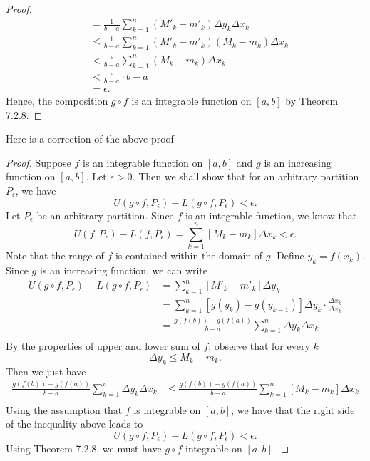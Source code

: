 \begin{enumerate}
\begin{proof}
\begin{align*}
								&=  \frac{ 1 }{ b-a } \sum_{ k=1 }^{ n }  (M'_{k} - m'_{k }) \Delta y_{k} \Delta x_{k } \\
								&\leq \frac{ 1 }{ b-a } \sum_{ k=1 }^{ n } (M'_{k } - m'_{k } )  (M_{k } - m_{k } ) \Delta x_{k } \\
								&< \frac{ \epsilon  }{ b -a  } \sum_{ k=1 }^{ n } (M_{k } - m_{k }) \Delta x_{k } \\
								&< \frac{ \epsilon  }{ b -a  } \cdot b -a  \\
								&= \epsilon.
 	\end{align*}
	Hence, the composition \( g \circ f \) is an integrable function on \( [a,b] \) by Theorem 7.2.8.
	\end{proof}
	Here is a correction of the above proof
	\begin{proof}
		Suppose \( f  \) is an integrable function on \( [a,b] \) and \( g  \) is an increasing function on \( [a,b]  \). Let \( \epsilon > 0  \). Then we shall show that for an arbitrary partition \( P_{\epsilon } \), we have 
		\[  U( g \circ f, P_{\epsilon }) - L(g \circ f, P_{\epsilon }) < \epsilon. \] 
		Let \( P_{\epsilon } \) be an arbitrary partition. Since \( f  \) is an integrable function, we know that
		\[  U(f, P_{\epsilon }) - L(f, P_{\epsilon }) = \sum_{ k=1 }^{ n } [M_{k} - m_{k }] \Delta x_{k} < \epsilon. \]
		Note that the range of \( f  \) is contained within the domain of \( g  \). Define \( y_{k} = f(x_{k}) \). Since \( g  \) is an increasing function, we can write 
		\begin{align*}
			U(g \circ f, P_{\epsilon }) - L(g \circ f, P_{\epsilon }) &= \sum_{ k=1 }^{ n } [ M'_{k} - m'_{k}] \Delta y_{k} \\ 
																	  &= \sum_{ k=1 }^{ n } [ g(y_{k } ) - g(y_{k-1})] \Delta y_{k} \cdot \frac{ \Delta x_{k } }{ \Delta x_{k}  } \\
																	  &= \frac{ g(f(b)) - g(f(a))   }{ b - a  } \sum_{ k=1 }^{ n } \Delta y_{k} \Delta x_{k } \\ 
		\end{align*}
		By the properties of upper and lower sum of \( f  \), observe that for every \( k  \)
		\[ \Delta y_{k} \leq M_{k } - m_{k }.  \]
		Then we just have 
		\begin{align*}
			\frac{ g(f(b)) - g(f(a))  }{ b -a  }  \sum_{ k=1 }^{ n }  \Delta y_{k} \Delta x_{k} &\leq \frac{ g(f(b)) - g(f(a))  }{ b - a  } \sum_{ k=1 }^{ n } [ M_{k} - m_{k }] \Delta x_{k }  \\
		\end{align*}
		Using the assumption that \( f  \) is integrable on \( [a,b]  \), we have that the right side of the inequality above leads to 
		\[  U(g \circ f, P_{\epsilon }) - L(g \circ f, P_{\epsilon }) < \epsilon. \]
		Using Theorem 7.2.8, we must have \( g \circ f  \) integrable on \( [a,b] \).

	\end{proof}
\end{enumerate}



